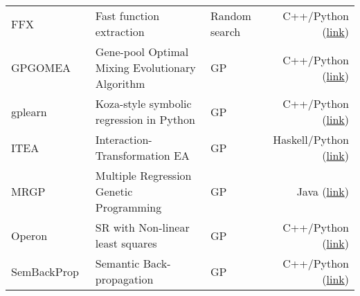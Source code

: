 \begin{table}
\begin{tabular}{l L{12em} L{8em} r}
        FFX~\cite{mcconaghyFFXFastScalable2011}         &   Fast function extraction             &   Random search               
                    &   C++/Python (\href{https://github.com/natekupp/ffx/tree/master/ffx}{link})                  \\
        GPGOMEA~\cite{virgolin2020improving}     &   Gene-pool Optimal Mixing Evolutionary Algorithm     & GP            
                    &   C++/Python (\href{https://github.com/marcovirgolin/GP-GOMEA/}{link})                  \\
        gplearn     &   Koza-style symbolic regression in Python       &   GP                          
                    &   C++/Python (\href{https://github.com/trevorstephens/gplearn}{link})                  \\
        ITEA~\cite{defrancaInteractionTransformationEvolutionaryAlgorithm2020}   &   Interaction-Transformation EA       &   GP
                    &   Haskell/Python (\href{https://github.com/folivetti/ITEA/}{link})              \\
        MRGP~\cite{arnaldoMultipleRegressionGenetic2014a}                        &   Multiple Regression Genetic Programming &   GP
                    &   Java (\href{https://github.com/flexgp/gp-learners}{link})                        \\
        Operon~\cite{kommendaParameterIdentificationSymbolic2019}                &   SR with Non-linear least squares     &   GP
                    &   C++/Python (\href{https://github.com/heal-research/operon}{link})                  \\
        SemBackProp~\cite{virgolinLinearScalingSemantic2019}                     &   Semantic Back-propagation           &   GP
                    &   C++/Python (\href{https://github.com/marcovirgolin/GP-GOMEA}{link})                  \\ 
        \bottomrule
    \end{tabular}
\end{table}

